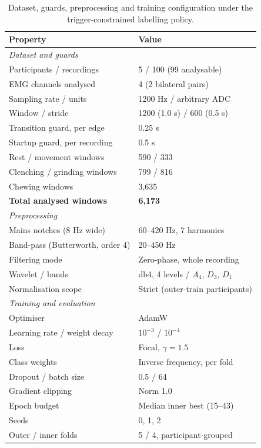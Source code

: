 \documentclass[journal]{IEEEtran}
\begin{document}
\begin{table}[!t]
  \caption{Dataset, guards, preprocessing and training configuration under the trigger-constrained labelling policy.}
  \label{tab:dataset}
  \centering
  \footnotesize
  \begin{tabular*}{\columnwidth}{@{\extracolsep{\fill}}ll@{}}
    \toprule
    Property & Value \\
    \midrule
    \multicolumn{2}{l}{\emph{Dataset and guards}}\\
    Participants / recordings & 5 / 100 (99 analysable) \\
    EMG channels analysed & 4 (2 bilateral pairs) \\
    Sampling rate / units & 1200 Hz / arbitrary ADC \\
    Window / stride & 1200 (1.0 s) / 600 (0.5 s) \\
    Transition guard, per edge & 0.25 s \\
    Startup guard, per recording & 0.5 s \\
    Rest / movement windows & 590 / 333 \\
    Clenching / grinding windows & 799 / 816 \\
    Chewing windows & 3,635 \\
    \textbf{Total analysed windows} & \textbf{6{,}173} \\
    \midrule
    \multicolumn{2}{l}{\emph{Preprocessing}}\\
    Mains notches (8 Hz wide) & 60--420 Hz, 7 harmonics \\
    Band-pass (Butterworth, order 4) & 20--450 Hz \\
    Filtering mode & Zero-phase, whole recording \\
    Wavelet / bands & db4, 4 levels / $A_4$, $D_3$, $D_1$ \\
    Normalisation scope & Strict (outer-train participants) \\
    \midrule
    \multicolumn{2}{l}{\emph{Training and evaluation}}\\
    Optimiser & AdamW \\
    Learning rate / weight decay & $10^{-3}$ / $10^{-4}$ \\
    Loss & Focal, $\gamma = 1.5$ \\
    Class weights & Inverse frequency, per fold \\
    Dropout / batch size & 0.5 / 64 \\
    Gradient clipping & Norm 1.0 \\
    Epoch budget & Median inner best (15--43) \\
    Seeds & 0, 1, 2 \\
    Outer / inner folds & 5 / 4, participant-grouped \\
    \bottomrule
  \end{tabular*}
\end{table}
\end{document}
